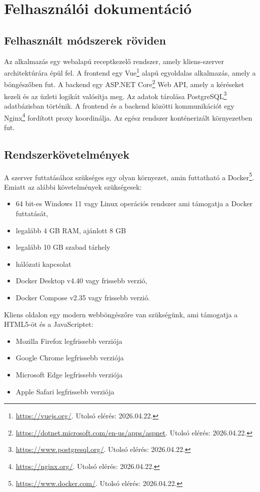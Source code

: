 ﻿\chapter{Felhasználói dokumentáció}\label{ch:problem-definition}

\section{Felhasznált módszerek röviden}

Az alkalmazás egy webalapú receptkezelő rendszer, amely kliens-szerver architektúrára épül fel. A frontend egy Vue\footnote{\url{https://vuejs.org/}. Utolsó elérés: 2026.04.22.} alapú egyoldalas alkalmazás, amely a böngészőben fut. A backend egy ASP.NET Core\footnote{\url{https://dotnet.microsoft.com/en-us/apps/aspnet}. Utolsó elérés: 2026.04.22.} Web API, amely a kéréseket kezeli és az üzleti logikát valósítja meg. Az adatok tárolása PostgreSQL\footnote{\url{https://www.postgresql.org/}. Utolsó elérés: 2026.04.22.} adatbázisban történik. A frontend és a backend közötti kommunikációt egy Nginx\footnote{\url{https://nginx.org/}. Utolsó elérés: 2026.04.22.} fordított proxy koordinálja. Az egész rendszer konténerizált környezetben fut.

\section{Rendszerkövetelmények}

A szerver futtatásához szükséges egy olyan környezet, amin futtatható a Docker\footnote{\url{https://www.docker.com/}. Utolsó elérés: 2026.04.22.}. Emiatt az alábbi követelmények szükségesek:
\begin{itemize}
	\item 64 bit-es Windows 11 vagy Linux operációs rendszer ami támogatja a Docker futtatását,
	\item legalább 4 GB RAM, ajánlott 8 GB
	\item legalább 10 GB szabad tárhely
	\item hálózati kapcsolat
	\item Docker Desktop v4.40 vagy frissebb verzió,
	\item Docker Compose v2.35 vagy frissebb verzió.
\end{itemize}

Kliens oldalon egy modern webböngészőre van szükségünk, ami támogatja a HTML5-öt és a JavaScriptet:
\begin{itemize}
	\item Mozilla Firefox legfrissebb verziója
	\item Google Chrome legfrissebb verziója
	\item Microsoft Edge legfrissebb verziója
	\item Apple Safari legfrissebb verziója
\end{itemize}

